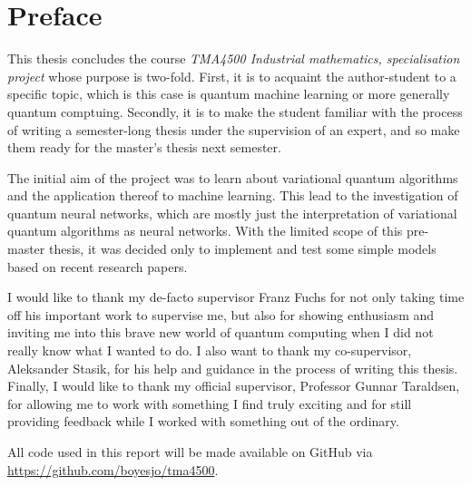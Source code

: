 \section*{Preface}
This thesis concludes the course \textit{TMA4500 Industrial mathematics, specialisation project} whose purpose is two-fold.
First, it is to acquaint the author-student to a specific topic, which is this case is quantum machine learning or more generally quantum comptuing.
Secondly, it is to make the student familiar with the process of writing a semester-long thesis under the supervision of an expert, and so make them ready for the master's thesis next semester.

The initial aim of the project was to learn about variational quantum algorithms and the application thereof to machine learning.
This lead to the investigation of quantum neural networks, which are mostly just the interpretation of variational quantum algorithms as neural networks.
With the limited scope of this pre-master thesis, it was decided only to implement and test some simple models based on recent research papers.

I would like to thank my de-facto supervisor Franz Fuchs for not only taking time off his important work to supervise me, but also for showing enthusiasm and inviting me into this brave new world of quantum computing when I did not really know what I wanted to do.
I also want to thank my co-supervisor, Aleksander Stasik, for his help and guidance in the process of writing this thesis.
Finally, I would like to thank my official supervisor, Professor Gunnar Taraldsen, for allowing me to work with something I find truly exciting and for still providing feedback while I worked with something out of the ordinary.

All code used in this report will be made available on GitHub via \url{https://github.com/boyesjo/tma4500}.



\cleardoublepage